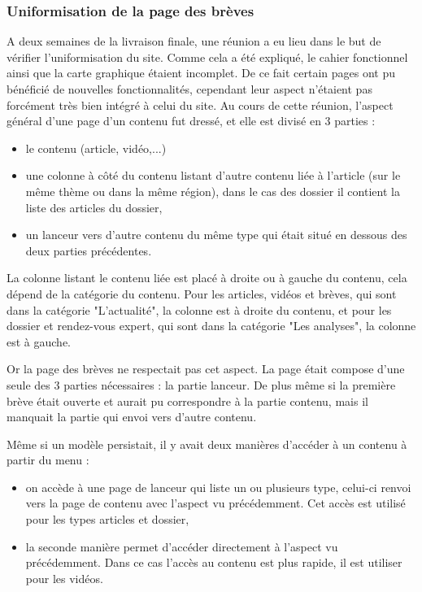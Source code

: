 \documentclass[12pt,a4paper]{article}
\begin{document}
\subsubsection{Uniformisation de la page des brèves}
A deux semaines de la livraison finale, une réunion a eu lieu dans le but de vérifier l'uniformisation du site. Comme cela a été expliqué, le cahier fonctionnel ainsi que la carte graphique étaient incomplet. De ce fait certain pages ont pu bénéficié de nouvelles fonctionnalités, cependant leur aspect n'étaient pas forcément très bien intégré à celui du site. Au cours de cette réunion, l'aspect général d'une page d'un contenu fut dressé, et elle est divisé en 3 parties :
\begin{itemize}
\item le contenu (article, vidéo,...)
\item une colonne à côté du contenu listant d'autre contenu liée à l'article (sur le même thème ou dans la même région), dans le cas des dossier il contient la liste des articles du dossier,
\item un lanceur vers d'autre contenu du même type qui était situé en dessous des deux parties précédentes.
\end{itemize}\par
La colonne listant le contenu liée est placé à droite ou à gauche du contenu, cela dépend de la catégorie du  contenu. Pour les articles, vidéos et brèves, qui sont dans la catégorie "L'actualité", la colonne est à droite du contenu, et pour les dossier et rendez-vous expert, qui sont dans la catégorie "Les analyses", la colonne est à gauche.\par
\bigskip
Or la page des brèves ne respectait pas cet aspect. La page était compose d'une seule des 3 parties nécessaires : la partie lanceur. De plus même si la première brève était ouverte et aurait pu correspondre à la partie contenu, mais il manquait la partie qui envoi vers d'autre contenu.\par 
Même si un modèle persistait, il y avait deux manières d'accéder à un contenu à partir du menu : 
\begin{itemize}
\item on accède à une page de lanceur qui liste un ou plusieurs type, celui-ci renvoi vers la page de contenu avec l'aspect vu précédemment. Cet accès est utilisé pour les types articles et dossier,
\item la seconde manière permet d'accéder directement à l'aspect vu précédemment. Dans ce cas l'accès au contenu est plus rapide, il est utiliser pour les vidéos. 
\end{itemize}\par 
\end{document}

